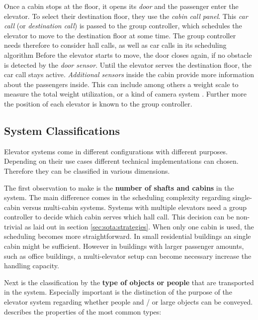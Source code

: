 Once a cabin stops at the floor, it opens its \emph{door} and the passenger enter the elevator.
To select their destination floor, they use the \emph{cabin call panel}.
This \emph{car call} (or \emph{destination call}) \autocite[][pp.~6--10]{siikonen1997models} is passed to the group controller, 
which schedules the elevator to move to the destination floor at some time.
The group controller needs therefore to consider hall calls, as well as car calls in its scheduling algorithm
Before the elevator starts to move, the door closes again, if no obstacle is detected by the \emph{door sensor}.
Until the elevator serves the destination floor, the car call stays active.
\emph{Additional sensors} inside the cabin provide more information about the passengers inside.
This can include among others a weight scale to measure the total weight utilization, or a kind of camera system \autocite[][]{xang2016trafficlist}.
Further more the position of each elevator is known to the group controller.

\subsection{System Classifications}

Elevator systems come in different configurations with different purposes.
Depending on their use cases different technical implementations can chosen.
Therefore they can be classified in various dimensions.

The first observation to make is the \textbf{number of shafts and cabins} in the system.
The main difference comes in the scheduling complexity regarding single-cabin versus multi-cabin systems.
Systems with multiple elevators need a group controller to decide which cabin serves which hall call.
This decision can be non-trivial as laid out in section \vref{sec:sota:strategies}.
When only one cabin is used, the scheduling becomes more straightforward.
In small residential buildings an single cabin might be sufficient.
However in buildings with larger passenger amounts, such as office buildings, a multi-elevator setup can become necessary increase the handling capacity.

Next is the classification by the \textbf{type of objects or people} that are transported in the system. Especially important is the distinction of the purpose of the elevator system regarding whether people and / or large objects can be conveyed.
\textcite[][pp.~141--158]{unger2015aufzuege} describes the properties of the most common types:

